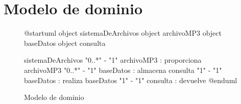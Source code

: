 
\section*{Modelo de dominio}

\begin{figure}[h]
	\centering
  \begin{plantuml}
    @startuml
    object sistemaDeArchivos
    object archivoMP3
    object baseDatos
    object consulta
  
    sistemaDeArchivos "0..*" - "1" archivoMP3 : proporciona
    archivoMP3 "0..*" - "1" baseDatos : almacena
    consulta "1" - "1" baseDatos : realiza
    baseDatos "1" - "1" consulta : devuelve
    @enduml
  \end{plantuml}
	\caption{Modelo de dominio}
\end{figure}